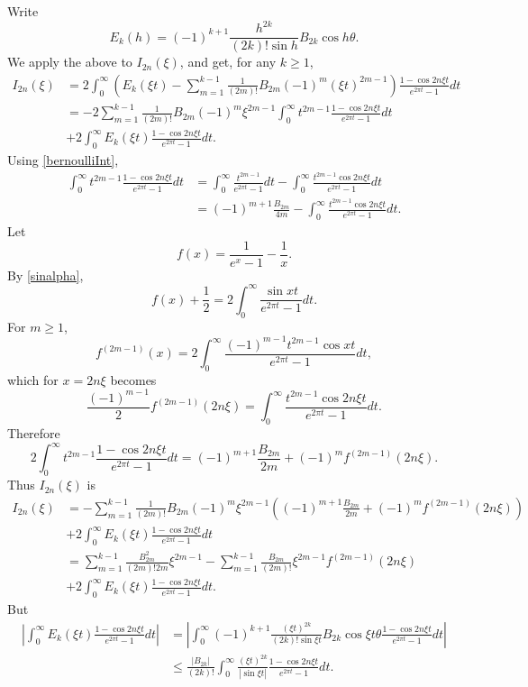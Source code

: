 \documentclass{article}
\begin{document}
Write
\[
E_k(h) = (-1)^{k+1} \frac{h^{2k}}{(2k)! \sin h}B_{2k} \cos h\theta.
\]
We apply the above to $I_{2n}(\xi)$, and get, for any $k \geq 1$,
\begin{align*}
I_{2n}(\xi)&=2\int_0^\infty \left(E_k(\xi t)-
\sum_{m=1}^{k-1} \frac{1}{(2m)!} B_{2m} (-1)^m (\xi t)^{2m-1} \right) \frac{1-\cos 2n\xi t}{e^{2\pi t}-1} dt\\
&= -2\sum_{m=1}^{k-1} \frac{1}{(2m)!} B_{2m} (-1)^m \xi^{2m-1} \int_0^\infty  t^{2m-1} 
 \frac{1-\cos 2n\xi t}{e^{2\pi t}-1} dt\\
 &+2 \int_0^\infty E_k(\xi t)  \frac{1-\cos 2n\xi t}{e^{2\pi t}-1} dt.
\end{align*} 
Using \eqref{bernoulliInt},
\begin{align*}
 \int_0^\infty  t^{2m-1} 
 \frac{1-\cos 2n\xi t}{e^{2\pi t}-1} dt&=
 \int_0^\infty \frac{t^{2m-1}}{e^{2\pi t}-1} dt
 -\int_0^\infty \frac{t^{2m-1} \cos 2n\xi t}{e^{2\pi t}-1} dt\\
 &=(-1)^{m+1} \frac{B_{2m}}{4m} -\int_0^\infty \frac{t^{2m-1} \cos 2n\xi t}{e^{2\pi t}-1} dt.
\end{align*}
Let
\[
f(x)=\frac{1}{e^x-1}-\frac{1}{x}.
\]
By \eqref{sinalpha},
\[
f(x)+\frac{1}{2} = 2 \int_0^\infty \frac{\sin x t}{e^{2\pi t}-1} dt.
\]
For $m \geq 1$, 
\[
f^{(2m-1)}(x) = 2\int_0^\infty \frac{(-1)^{m-1} t^{2m-1} \cos x t}{e^{2\pi t}-1} dt,
\]
which for $x=2n\xi$ becomes
\[
\frac{(-1)^{m-1}}{2} f^{(2m-1)}(2n\xi) = \int_0^\infty \frac{t^{2m-1} \cos 2n\xi t}{e^{2\pi t}-1} dt.
\]
Therefore
\[
2 \int_0^\infty  t^{2m-1} 
 \frac{1-\cos 2n\xi t}{e^{2\pi t}-1} dt
 =(-1)^{m+1} \frac{B_{2m}}{2m}+(-1)^{m} f^{(2m-1)}(2n\xi).
\]
Thus $I_{2n}(\xi)$ is
\begin{align*}
I_{2n}(\xi)&=-\sum_{m=1}^{k-1} \frac{1}{(2m)!} B_{2m} (-1)^m \xi^{2m-1} 
\left(
(-1)^{m+1} \frac{B_{2m}}{2m}+(-1)^{m} f^{(2m-1)}(2n\xi)
\right)
\\
 &+2 \int_0^\infty E_k(\xi t)  \frac{1-\cos 2n\xi t}{e^{2\pi t}-1} dt\\
 &=\sum_{m=1}^{k-1} \frac{B_{2m}^2}{(2m)! 2m} \xi^{2m-1}
 -\sum_{m=1}^{k-1} \frac{B_{2m}}{(2m)!} \xi^{2m-1} f^{(2m-1)}(2n\xi)\\
&+2 \int_0^\infty E_k(\xi t)  \frac{1-\cos 2n\xi t}{e^{2\pi t}-1} dt.
\end{align*}
But
\begin{align*}
\left| \int_0^\infty E_k(\xi t)  \frac{1-\cos 2n\xi t}{e^{2\pi t}-1} dt\right|&=
\left| \int_0^\infty (-1)^{k+1} \frac{(\xi t)^{2k}}{(2k)! \sin \xi t}B_{2k} \cos \xi t \theta 
 \frac{1-\cos 2n\xi t}{e^{2\pi t}-1} dt \right|\\
 &\leq \frac{|B_{2k}|}{(2k)!}  \int_0^\infty  \frac{(\xi t)^{2k}}{|\sin \xi t|} \frac{1-\cos 2n\xi t}{e^{2\pi t}-1} dt.
 \end{align*}
\end{document}
